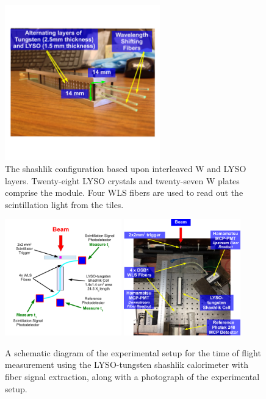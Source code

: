 \documentclass[12pt]{article}
\begin{document}
\begin{figure}[H] \centering
\includegraphics[width=0.6\textwidth]{figs/ShashlikCellPhoto.pdf} 
\caption{ The shashlik configuration based upon interleaved W and LYSO layers. 
Twenty-eight LYSO crystals and twenty-seven W plates comprise the module.
Four WLS fibers are used to read out the scintillation light from the 
tiles. } 
\label{fig:ShashlikDiagram}
\end{figure}

\begin{figure}[H] \centering
\includegraphics[width=0.45\textwidth]{figs/ShashlikFiberSetupSchematic} 
\includegraphics[width=0.45\textwidth]{figs/ShashlikFiberSetupPhoto} 
\caption{ A schematic diagram of the experimental setup for the
time of flight measurement using the LYSO-tungsten shashlik calorimeter
with fiber signal extraction, along with a photograph of the
experimental setup. } 
\label{fig:ShashlikFiberSetup}
\end{figure}
\end{document}

